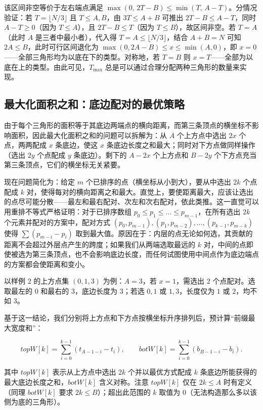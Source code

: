 该区间非空等价于左右端点满足 $\max(0,\, 2T - B) \le \min(T,\, A - T)$。分情况验证：若 $T = \lfloor N/3 \rfloor$ 且 $T \le A, B$，由 $3T \le A + B$ 可推出 $2T - B \le A - T$，同时 $A - T \ge 0$（因为 $T \le A$），且 $2T - B \le T$（因为 $T \le B$），故区间非空。若 $T = A$（此时 $A$ 是三者中最小者），代入得 $T = A \le \lfloor N/3 \rfloor$，结合 $A + B = N$ 可知 $2A \le B$，此时可行区间退化为 $\max(0, 2A - B) \le x \le \min(A, 0)$，即 $x = 0$——全部三角形均为以底在下的类型。对称地，若 $T = B$ 则 $x = T$——全部为以底在上的类型。由此可见，$T_{\max}$ 总是可以通过合理分配两种三角形的数量来实现。

\subsection{最大化面积之和：底边配对的最优策略}

由于每个三角形的面积等于其底边两端点的横向距离，而第三条顶点的横坐标不影响面积，因此最大化面积之和的问题可以拆解为：从 $A$ 个上方点中选出 $2x$ 个点，两两配成 $x$ 条底边，使这 $x$ 条底边长度之和最大；同时对下方点做同样操作（选出 $2y$ 个点配成 $y$ 条底边）。剩下的 $A - 2x$ 个上方点和 $B - 2y$ 个下方点充当第三条顶点，它们的横坐标无关紧要。

现在问题简化为：给定 $m$ 个已排序的点（横坐标从小到大），要从中选出 $2k$ 个点配成 $k$ 对，使得每对的横向距离之和最大。直觉上，要使距离最大，应该让选出的点尽可能分散——最左和最右配对、次左和次右配对，依此类推。这一直觉可以用重排不等式严格证明：对于已排序数组 $p_0 \le p_1 \le \dots \le p_{m-1}$，在所有选出 $2k$ 个元素并配对的方案中，配对方式 $(p_0, p_{m-1}), (p_1, p_{m-2}), \dots, (p_{k-1}, p_{m-k})$ 使得 $\sum (p_{m-i} - p_i)$ 取到最大值。原因在于：内层的点无论如何选，其贡献的距离不会超过外层点产生的跨度；如果我们从两端选取最远的 $k$ 对，中间的点即使被选为第三条顶点，也不会影响底边长度，而任何试图使用中间点作为底边端点的方案都会使距离和变小。

以样例 $2$ 的上方点集 $(0, 1, 3)$ 为例：$A = 3$，若 $x = 1$，需选出 $2$ 个点配对。选取最左的 $0$ 和最右的 $3$，底边长度为 $3$；若选 $0, 1$ 或 $1, 3$，长度仅为 $1$ 或 $2$，均不如 $3$。

基于这一结论，我们分别将上方点和下方点按横坐标升序排列后，预计算“前缀最大宽度和”：

\[
\mathit{topW}[k] = \sum_{i=0}^{k-1} (t_{A-1-i} - t_i),\qquad
\mathit{botW}[k] = \sum_{i=0}^{k-1} (b_{B-1-i} - b_i).
\]

其中 $\mathit{topW}[k]$ 表示从上方点中选出 $2k$ 个并以最优方式配成 $k$ 条底边所能获得的最大底边长度之和，$\mathit{botW}[k]$ 含义对称。注意 $\mathit{topW}[k]$ 仅在 $2k \le A$ 时有定义（同理 $\mathit{botW}[k]$ 要求 $2k \le B$）；超出此范围的 $k$ 取值为 $0$（无法构造那么多以该侧为底的三角形）。

